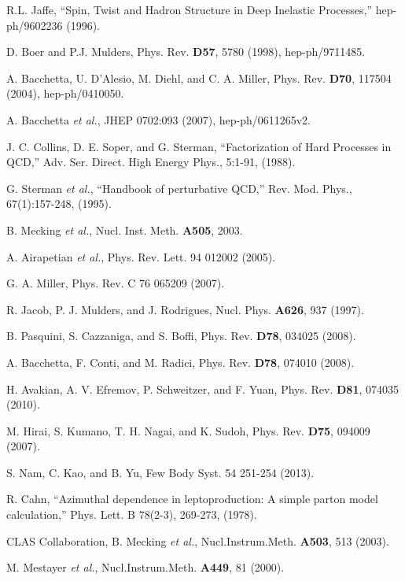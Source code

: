 \begin{thebibliography}{99}
	R.L. Jaffe, ``Spin, Twist and Hadron Structure in Deep Inelastic Processes,''
	hep-ph/9602236 (1996).

	D. Boer and P.J. Mulders, Phys. Rev. \textbf{D57},
	5780 (1998), hep-ph/9711485.

	A. Bacchetta, U. D'Alesio, M. Diehl, and C. A. Miller, Phys. Rev. \textbf{D70},
	117504 (2004), hep-ph/0410050.

	A. Bacchetta \emph{et al.}, JHEP 0702:093 (2007), hep-ph/0611265v2.

	J. C. Collins, D. E. Soper, and G. Sterman, ``Factorization of Hard Processes in QCD,''
	Adv. Ser. Direct. High Energy Phys., 5:1-91, (1988).

	G. Sterman \emph{et al.}, ``Handbook of perturbative QCD,''
	Rev. Mod. Phys., 67(1):157-248, (1995).

	B. Mecking \emph{et al.}, Nucl. Inst. Meth. \textbf{A505}, 2003.

	A. Airapetian \emph{et al.}, Phys. Rev. Lett. 94 012002 (2005).

	G. A. Miller, Phys. Rev. C 76 065209 (2007).

	R. Jacob, P. J. Mulders, and J. Rodrigues, Nucl. Phys. \textbf{A626}, 937 (1997).

	B. Pasquini, S. Cazzaniga, and S. Boffi, Phys. Rev. \textbf{D78}, 034025 (2008).

	A. Bacchetta, F. Conti, and M. Radici, Phys. Rev. \textbf{D78}, 074010 (2008).

	H. Avakian, A. V. Efremov, P. Schweitzer, and F. Yuan, Phys. Rev. \textbf{D81}, 074035 (2010).

	M. Hirai, S. Kumano, T. H. Nagai, and K. Sudoh, Phys. Rev. \textbf{D75}, 094009 (2007).

	S. Nam, C. Kao, and B. Yu, Few Body Syst. 54 251-254 (2013).

	R. Cahn, ``Azimuthal dependence in leptoproduction: A simple parton model calculation,''
	Phys. Lett. B 78(2-3), 269-273, (1978).

	CLAS Collaboration, B. Mecking \emph{et al.}, Nucl.Instrum.Meth. \textbf{A503}, 513 (2003).

	M. Mestayer \emph{et al.}, Nucl.Instrum.Meth. \textbf{A449}, 81 (2000).


\end{thebibliography}
